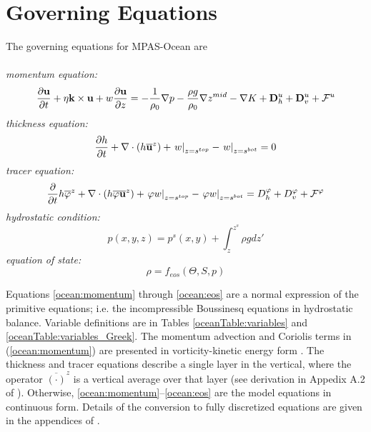 \chapter{Governing Equations}
\label{chap:ocean-intro}

The governing equations for MPAS-Ocean are\\ \\
{\it momentum equation:}
\begin{equation}
\label{ocean:momentum}
\frac{\partial {\bf u}}{\partial t} 
+ \eta {\bf k} \times {\bf u}
+ w\frac{\partial {\bf u}}{\partial z}
  = - \frac{1}{\rho_0}\nabla p - \frac{\rho g}{\rho_0}\nabla z^{mid}
 - \nabla K
+ {\bf D}^u_h + {\bf D}^u_v + {\cal F}^u
\end{equation}
{\it thickness equation:}
\begin{equation}
\label{ocean:thickness}
\frac{\partial h}{\partial t}
+ \nabla\cdot\left(h \overline{ {\bf u} }^z\right)
+ \left.  w \right|_{z=s^{top}} 
- \left.  w \right|_{z=s^{bot}} 
= 0
\end{equation}
{\it tracer equation:}
\begin{equation}
\label{ocean:tracer}
\frac{\partial}{\partial t} h \overline{\varphi}^z
+ \nabla\cdot\left(h \overline{\varphi {\bf u} }^z\right)
+ \left. \varphi w \right|_{z=s^{top}} 
- \left. \varphi w \right|_{z=s^{bot}} 
=  D^\varphi_h +  D^\varphi_v
+ {\cal F}^\varphi
\end{equation}
{\it hydrostatic condition:}
\begin{equation}
\label{ocean:pressure}
p(x,y,z) = p^{s}(x,y) + \int_{z}^{z^s} \rho g dz'
\end{equation}
{\it equation of state:}
\begin{equation}
\label{ocean:eos}
\rho = f_{eos}(\Theta,S,p)
\end{equation}

Equations \ref{ocean:momentum} through \ref{ocean:eos} are a normal expression of the primitive equations; i.e. the incompressible Boussinesq equations in hydrostatic balance.  Variable definitions are in Tables \ref{oceanTable:variables} and \ref{oceanTable:variables_Greek}.  The momentum advection and Coriolis terms in (\ref{ocean:momentum}) are presented in vorticity-kinetic energy form \citep[eqn 5]{Ringler_ea10jcp}.  The thickness and tracer equations describe a single layer in the vertical, where the operator $\overline{\left(\cdot\right)}^z$ is a vertical average over that layer (see derivation in Appedix A.2 of \citet{Ringler_ea13om}).  Otherwise, \ref{ocean:momentum}--\ref{ocean:eos} are the model equations in continuous form.  Details of the conversion to fully discretized equations are given in the appendices of \citet{Ringler_ea13om}.  

